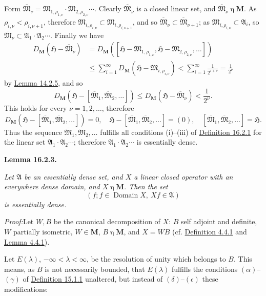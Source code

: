 \documentclass[12pt,b5paper,twoside]{article}
\newcommand{\Hspace}{\mathfrak H}
\newcommand{\M}{\mathbf M}
\newcommand{\Lemma}[1]{%
  \par\smallskip\noindent\phantomsection\label{lem:#1}\textbf{Lemma #1.}\enspace
}
\newcommand{\Proof}{\par\noindent\textit{Proof:}\enspace}
\newcommand{\defref}[1]{\hyperref[def:#1]{Definition #1}}
\newcommand{\lemref}[1]{\hyperref[lem:#1]{Lemma #1}}
\begin{document}
Form
\(\overline{\mathfrak M}_\nu
=\mathfrak M_{1,\rho_{1,\nu}}\cdot
 \mathfrak M_{2,\rho_{2,\nu}}\cdots\).
Clearly \(\overline{\mathfrak M}_\nu\) is a closed linear set, and
\(\overline{\mathfrak M}_\nu\mathbin\eta\M\). As
\(\rho_{i,\nu}<\rho_{i,\nu+1}\), therefore
\(\mathfrak M_{i,\rho_{i,\nu}}\subset
\mathfrak M_{i,\rho_{i,\nu+1}}\), and so
\(\overline{\mathfrak M}_\nu\subset
\overline{\mathfrak M}_{\nu+1}\); as
\(\mathfrak M_{i,\rho_{i,\nu}}\subset\mathfrak A_i\), so
\(\overline{\mathfrak M}_\nu\subset
\mathfrak A_1\cdot\mathfrak A_2\cdots\). Finally we have
\[
\begin{aligned}
D_{\M}(\Hspace-\overline{\mathfrak M}_\nu)
 &=D_{\M}([\Hspace-\mathfrak M_{1,\rho_{1,\nu}},
            \Hspace-\mathfrak M_{2,\rho_{2,\nu}},\ldots])\\
 &\leq\sum_{i=1}^{\infty}
      D_{\M}(\Hspace-\mathfrak M_{i,\rho_{i,\nu}})
 <\sum_{i=1}^{\infty}\frac1{2^{i+\nu}}=\frac1{2^\nu}
\end{aligned}
\]
by \lemref{14.2.5}, and so
\[
D_{\M}(\Hspace-[\overline{\mathfrak M}_1,
\overline{\mathfrak M}_2,\ldots])
\leq D_{\M}(\Hspace-\overline{\mathfrak M}_\nu)<\frac1{2^\nu}.
\]
This holds for every \(\nu=1,2,\ldots\), therefore
\[
D_{\M}(\Hspace-[\overline{\mathfrak M}_1,
\overline{\mathfrak M}_2,\ldots])=0,
\quad
\Hspace-[\overline{\mathfrak M}_1,
\overline{\mathfrak M}_2,\ldots]=(0),
\quad
[\overline{\mathfrak M}_1,\overline{\mathfrak M}_2,\ldots]=\Hspace.
\]
Thus the sequence
\(\overline{\mathfrak M}_1,\overline{\mathfrak M}_2,\ldots\) fulfills all
conditions (i)--(iii) of \defref{16.2.1} for the linear set
\(\mathfrak A_1\cdot\mathfrak A_2\cdots\); therefore
\(\mathfrak A_1\cdot\mathfrak A_2\cdots\) is essentially dense.

\Lemma{16.2.3}
{\itshape Let \(\mathfrak A\) be an essentially dense set, and \(X\) a
linear closed operator with an everywhere dense domain, and
\(X\mathbin\eta\M\). Then the set
\[
(f;f\in\operatorname{Domain}X,\ Xf\in\mathfrak A)
\]
is essentially dense.}

\Proof Let \(W,B\) be the canonical decomposition of \(X\): \(B\) self
adjoint and definite, \(W\) partially isometric, \(W\in\M\),
\(B\mathbin\eta\M\), and \(X=WB\) (cf. \defref{4.4.1} and
\lemref{4.4.1}).

Let \(E(\lambda)\), \(-\infty<\lambda<\infty\), be the resolution of unity
which belongs to \(B\). This means, as \(B\) is not necessarily bounded,
that \(E(\lambda)\) fulfills the conditions \((\alpha)\)--\((\gamma)\) of
\defref{15.1.1} unaltered, but instead of
\((\delta)\)--\((\epsilon)\) these modifications:
\end{document}

